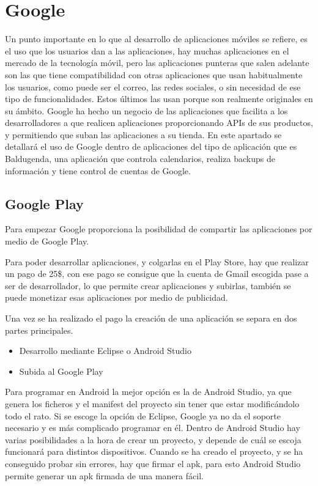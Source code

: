 \section{Google}
\label{secc:google}

Un punto importante en lo que al desarrollo de aplicaciones móviles se refiere, es el uso que los usuarios dan a las aplicaciones, hay muchas aplicaciones en el mercado de la tecnología móvil, pero las aplicaciones punteras que salen adelante son las que tiene compatibilidad con otras aplicaciones que usan habitualmente los usuarios, como puede ser el correo, las redes sociales, o sin necesidad de ese tipo de funcionalidades. Estos últimos las usan porque son realmente originales en su ámbito.
Google ha hecho un negocio de las aplicaciones que facilita a los desarrolladores a que  realicen aplicaciones proporcionando APIs de sus productos, y permitiendo que suban las aplicaciones a su tienda.
En este apartado se detallará el uso de Google dentro de aplicaciones del tipo de aplicación que es Baldugenda, una aplicación que controla calendarios, realiza backups de información  y tiene control de cuentas de Google.

\subsection{Google Play}
\label{subsecc:Google Play}

Para empezar Google proporciona la posibilidad de compartir  las aplicaciones por medio de Google Play.

Para poder desarrollar aplicaciones, y colgarlas en el Play Store, hay que realizar un pago de 25\$, con ese pago se consigue que la cuenta de Gmail escogida pase a ser de desarrollador, lo que permite crear aplicaciones y subirlas, también se puede monetizar esas aplicaciones por medio de publicidad.

Una vez se ha realizado el pago la creación de una aplicación se separa en dos partes principales.

\begin{itemize}
\item Desarrollo mediante Eclipse o \gls{Android Studio}
\item Subida al Google Play
\end{itemize}

Para programar en Android la mejor opción es la de Android Studio, ya que genera los ficheros y el manifest del proyecto sin tener que estar modificándolo todo el rato.
Si se escoge la opción de Eclipse, Google ya no da el soporte necesario y es más complicado programar en él.
Dentro de Android Studio hay varias posibilidades a la hora de crear un proyecto, y depende de cuál se escoja funcionará para distintos dispositivos.
Cuando se ha creado el proyecto, y se ha conseguido probar sin errores, hay que firmar el apk, para esto Android Studio permite generar un apk firmada de una manera fácil.

